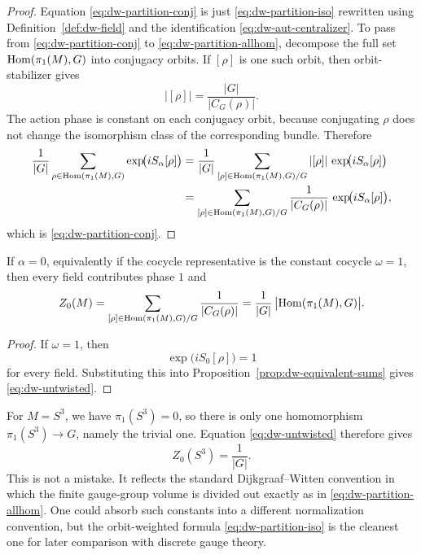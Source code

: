 \begin{proof}
Equation \eqref{eq:dw-partition-conj} is just \eqref{eq:dw-partition-iso} rewritten using Definition~\ref{def:dw-field} and the identification \eqref{eq:dw-aut-centralizer}. To pass from \eqref{eq:dw-partition-conj} to \eqref{eq:dw-partition-allhom}, decompose the full set $\operatorname{Hom}(\pi_1(M),G)$ into conjugacy orbits. If $[\rho]$ is one such orbit, then orbit-stabilizer gives
\begin{equation*}
|[\rho]|=\frac{|G|}{|C_G(\rho)|}.
\end{equation*}
The action phase is constant on each conjugacy orbit, because conjugating $\rho$ does not change the isomorphism class of the corresponding bundle. Therefore
\begin{align*}
\frac{1}{|G|}
\sum_{\rho\in \operatorname{Hom}(\pi_1(M),G)}
\exp\!\bigl(iS_\alpha[\rho]\bigr)
&=
\frac{1}{|G|}
\sum_{[\rho]\in \operatorname{Hom}(\pi_1(M),G)/G}
|[\rho]|\,
\exp\!\bigl(iS_\alpha[\rho]\bigr) \\
&=
\sum_{[\rho]\in \operatorname{Hom}(\pi_1(M),G)/G}
\frac{1}{|C_G(\rho)|}\,
\exp\!\bigl(iS_\alpha[\rho]\bigr),
\end{align*}
which is \eqref{eq:dw-partition-conj}.
\end{proof}

\begin{corollary}\label{cor:dw-untwisted}
If $\alpha=0$, equivalently if the cocycle representative is the constant cocycle $\omega=1$, then every field contributes phase $1$ and
\begin{equation}\label{eq:dw-untwisted}
Z_0(M)
=
\sum_{[\rho]\in \operatorname{Hom}(\pi_1(M),G)/G}
\frac{1}{|C_G(\rho)|}
=
\frac{1}{|G|}\,\bigl|\operatorname{Hom}(\pi_1(M),G)\bigr|.
\end{equation}
\end{corollary}

\begin{proof}
If $\omega=1$, then
\begin{equation*}
\exp\!\bigl(iS_0[\rho]\bigr)=1
\end{equation*}
for every field. Substituting this into Proposition~\ref{prop:dw-equivalent-sums} gives \eqref{eq:dw-untwisted}.
\end{proof}

\begin{remark}\label{rem:dw-s3}
For $M=S^3$, we have $\pi_1(S^3)=0$, so there is only one homomorphism $\pi_1(S^3)\to G$, namely the trivial one. Equation \eqref{eq:dw-untwisted} therefore gives
\begin{equation*}
Z_0(S^3)=\frac{1}{|G|}.
\end{equation*}
This is not a mistake. It reflects the standard Dijkgraaf--Witten convention in which the finite gauge-group volume is divided out exactly as in \eqref{eq:dw-partition-allhom}. One could absorb such constants into a different normalization convention, but the orbit-weighted formula \eqref{eq:dw-partition-iso} is the cleanest one for later comparison with discrete gauge theory.
\end{remark}

